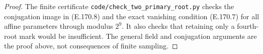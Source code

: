 \begin{proof}
The finite certificate \texttt{code/check\_two\_primary\_root.py}
checks the conjugation image in (E.170.8) and the exact vanishing
condition (E.170.7) for all affine parameters through modulus
\(2^9\). It also checks that retaining only a fourth-root mark
would be insufficient. The general field and conjugation
arguments are the proof above, not consequences of finite sampling.
\end{proof}
